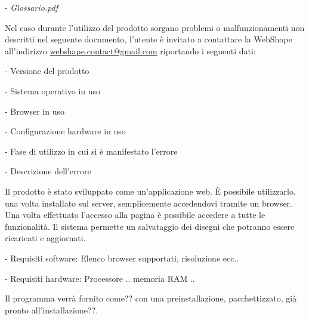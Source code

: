 \begin{elencopuntato}[\normindent]
	\item[-] \textit{Glossario.pdf}
\end{elencopuntato}

Nel caso durante l'utilizzo del prodotto sorgano problemi o malfunzionamenti non descritti nel seguente documento, l'utente \`e invitato a contattare la WebShape all'indirizzo \href{mailto:webshape.contact@gmail.com}{webshape.contact@gmail.com} riportando i seguenti dati:\\
\begin{elencopuntato}[\normindent]
	\item[-] Versione del prodotto
	\item[-] Sistema operativo in uso
	\item[-] Browser in uso
	\item[-] Configurazione hardware in uso
	\item[-] Fase di utilizzo in cui si \`e manifestato l'errore
	\item[-] Descrizione dell'errore
\end{elencopuntato}


Il prodotto \`e stato sviluppato come un'applicazione web. \`E possibile utilizzarlo, una volta installato sul server, semplicemente accedendovi tramite un browser. Una volta effettuato l'accesso alla pagina \`e possibile accedere a tutte le
funzionalit\`a. Il sistema permette un salvataggio dei disegni che potranno essere ricaricati e aggiornati.

\begin{elencopuntato}[\normindent]
    \item[-] Requisiti software:  Elenco browser supportati, risoluzione ecc..
    \item[-] Requisiti hardware:  Processore .. memoria RAM ..
\end{elencopuntato}


Il programma verr\`a fornito come?? con una preinstallazione, pacchettizzato, gi\`a pronto all'installazione??.






